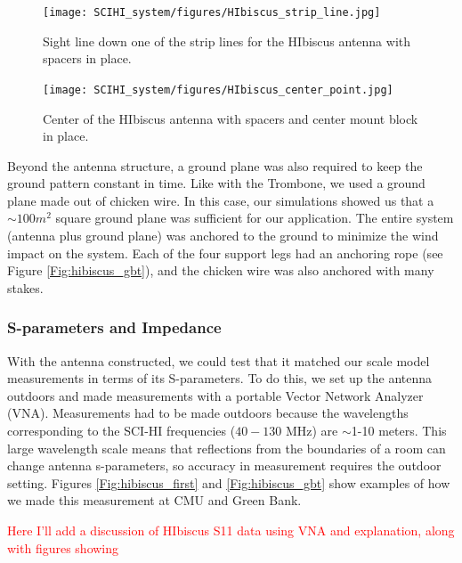 \begin{figure}[htb]
\centering
\begin{minipage}[b]{0.52\textwidth}
\centering
\texttt{[image: SCIHI\_system/figures/HIbiscus\_strip\_line.jpg]}
\caption{Sight line down one of the strip lines for the HIbiscus antenna with spacers in place.}
\label{Fig:hibiscus_spacer}
\end{minipage}%
\begin{minipage}[b]{0.02\textwidth}
\hspace{1cm}
\end{minipage}%
\begin{minipage}[b]{0.42\textwidth}
\centering
\texttt{[image: SCIHI\_system/figures/HIbiscus\_center\_point.jpg]}
\caption{Center of the HIbiscus antenna with spacers and center mount block in place.}
\label{Fig:hibiscus_center}
\end{minipage}
\end{figure}

Beyond the antenna structure, a ground plane was also required to keep the ground pattern constant in time. Like with the Trombone, we used a ground plane made out of chicken wire. In this case, our simulations showed us that a $\sim 100 m^2$ square ground plane was sufficient for our application. The entire system (antenna plus ground plane) was anchored to the ground to minimize the wind impact on the system. Each of the four support legs had an anchoring rope (see Figure \ref{Fig:hibiscus_gbt}), and the chicken wire was also anchored with many stakes. 
\subsubsection{S-parameters and Impedance}\label{Sec:HIbiscus_Imp}

With the antenna constructed, we could test that it matched our scale model measurements in terms of its S-parameters. To do this, we set up the antenna outdoors and made measurements with a portable Vector Network Analyzer (VNA). Measurements had to be made outdoors because the wavelengths corresponding to the SCI-HI frequencies ($40-130$ MHz) are $\sim$1-10 meters. This large wavelength scale means that reflections from the boundaries of a room can change antenna s-parameters, so accuracy in measurement requires the outdoor setting. Figures \ref{Fig:hibiscus_first} and \ref{Fig:hibiscus_gbt} show examples of how we made this measurement at CMU and Green Bank.

\textcolor{red}{Here I'll add a discussion of HIbiscus S11 data using VNA and explanation, along with figures showing}

